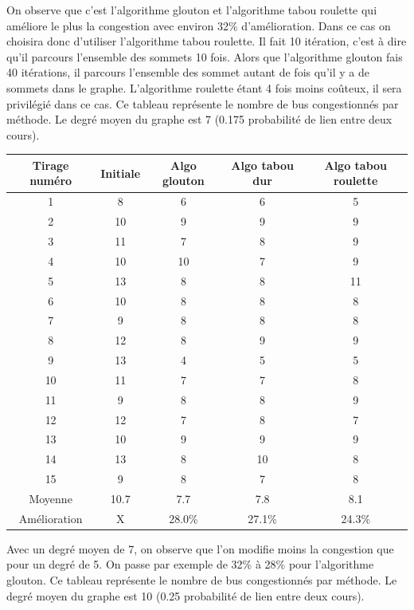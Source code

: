 \documentclass[a4paper,11pt]{article}
\begin{document}
	On observe que c'est l'algorithme glouton et l'algorithme tabou roulette qui améliore le plus la congestion avec environ 32\% d'amélioration. Dans ce cas on choisira donc d'utiliser l'algorithme tabou roulette. Il fait 10 itération, c'est à dire qu'il parcours l'ensemble des sommets 10 fois. Alors que l'algorithme glouton fais 40 itérations, il parcours l'ensemble des sommet autant de fois qu'il y a de sommets dans le graphe. L'algorithme roulette étant 4 fois moins coûteux, il sera privilégié dans ce cas.
	\newpage
	Ce tableau représente le nombre de bus congestionnés par méthode. Le degré moyen du graphe est 7 (0.175 probabilité de lien entre deux cours).\\ 
	\begin{tabular}{|c|c|c|c|c|}
  		\hline
  		Tirage numéro & Initiale & Algo glouton & Algo tabou dur & Algo tabou roulette\\
  		\hline
  		1 & 8 & 6 & 6 & 5\\
  		\hline
  		2 & 10 & 9 & 9 & 9\\
  		\hline
  		3 & 11 & 7 & 8 & 9\\
  		\hline
  		4 & 10 & 10 & 7 & 9\\
  		\hline
  		5 & 13 & 8 & 8 & 11\\
  		\hline
  		6 & 10 & 8 & 8 & 8\\
  		\hline
  		7 & 9 & 8 & 8 & 8\\
  		\hline
  		8 & 12 & 8 & 9 & 9\\
  		\hline
  		9 & 13 & 4 & 5 & 5\\
  		\hline
  		10 & 11 & 7 & 7 & 8\\
  		\hline
  		11 & 9 & 8 & 8 & 9\\
  		\hline
  		12 & 12 & 7 & 8 & 7\\
  		\hline
  		13 & 10 & 9 & 9 & 9\\
  		\hline
  		14 & 13 & 8 & 10 & 8\\
  		\hline
  		15 & 9 & 8 & 7 & 8\\
  		\hline
  		Moyenne & 10.7 & 7.7 & 7.8 & 8.1\\
  		\hline
  		Amélioration & X & 28.0\% & 27.1\% & 24.3\%\\
  		\hline
	\end{tabular}
	Avec un degré moyen de 7, on observe que l'on modifie moins la congestion que pour un degré de 5. On passe par exemple de 32\% à 28\% pour l'algorithme glouton.
	\newpage
	Ce tableau représente le nombre de bus congestionnés par méthode. Le degré moyen du graphe est 10 (0.25 probabilité de lien entre deux cours).\\ 
\end{document}
